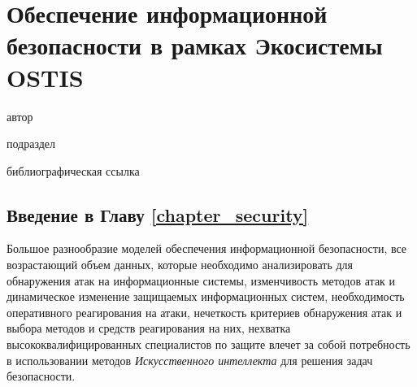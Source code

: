 \chapter{Обеспечение информационной безопасности в рамках Экосистемы OSTIS}
\label{chapter_security}

\vspace{-7\baselineskip}

\begin{SCn}
\begin{scnrelfromlist}{автор}
\end{scnrelfromlist}

\bigskip


\bigskip

\begin{scnrelfromlist}{подраздел}
\end{scnrelfromlist}

\bigskip

\begin{scnrelfromlist}{библиографическая ссылка}
\end{scnrelfromlist}
\end{SCn}


\section*{Введение в Главу \ref{chapter_security}}
Большое разнообразие моделей обеспечения информационной безопасности, все возрастающий объем данных, которые необходимо анализировать для обнаружения атак на информационные системы, изменчивость методов атак и динамическое изменение защищаемых информационных систем, необходимость оперативного реагирования на атаки, нечеткость критериев обнаружения атак и выбора методов и средств реагирования на них, нехватка высококвалифицированных специалистов по защите влечет за собой потребность в использовании методов \textit{Искусственного интеллекта} для решения задач безопасности.

